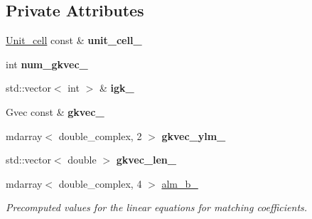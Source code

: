 \subsection*{Private Attributes}
\begin{DoxyCompactItemize}
\item 
\hypertarget{classsirius_1_1_matching__coefficients_a1007742253adc344acf7a37700dbece5}{}\hyperlink{classsirius_1_1_unit__cell}{Unit\+\_\+cell} const \& {\bfseries unit\+\_\+cell\+\_\+}\label{classsirius_1_1_matching__coefficients_a1007742253adc344acf7a37700dbece5}

\item 
\hypertarget{classsirius_1_1_matching__coefficients_a50a941d9e624eb4b5c9ea68488d856a1}{}int {\bfseries num\+\_\+gkvec\+\_\+}\label{classsirius_1_1_matching__coefficients_a50a941d9e624eb4b5c9ea68488d856a1}

\item 
\hypertarget{classsirius_1_1_matching__coefficients_acf9a7d3bd8153db936e9fb5645d98f05}{}std\+::vector$<$ int $>$ \& {\bfseries igk\+\_\+}\label{classsirius_1_1_matching__coefficients_acf9a7d3bd8153db936e9fb5645d98f05}

\item 
\hypertarget{classsirius_1_1_matching__coefficients_a10f18f5d19ccfd0c192b4233487d0e41}{}Gvec const \& {\bfseries gkvec\+\_\+}\label{classsirius_1_1_matching__coefficients_a10f18f5d19ccfd0c192b4233487d0e41}

\item 
\hypertarget{classsirius_1_1_matching__coefficients_ab75a0cbe7e02bc2f17a44dbbf7979df4}{}mdarray$<$ double\+\_\+complex, 2 $>$ {\bfseries gkvec\+\_\+ylm\+\_\+}\label{classsirius_1_1_matching__coefficients_ab75a0cbe7e02bc2f17a44dbbf7979df4}

\item 
\hypertarget{classsirius_1_1_matching__coefficients_a02bebe3cad838762323d7b7e9222fcf0}{}std\+::vector$<$ double $>$ {\bfseries gkvec\+\_\+len\+\_\+}\label{classsirius_1_1_matching__coefficients_a02bebe3cad838762323d7b7e9222fcf0}

\item 
mdarray$<$ double\+\_\+complex, 4 $>$ \hyperlink{classsirius_1_1_matching__coefficients_a2cf6962661c56f014c2d6280fde9c99a}{alm\+\_\+b\+\_\+}
\begin{DoxyCompactList}\small\item\em Precomputed values for the linear equations for matching coefficients. \end{DoxyCompactList}\end{DoxyCompactItemize}


